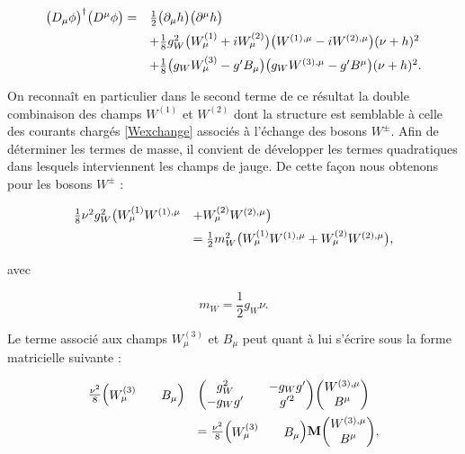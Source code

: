         \begin{equation*}
        \begin{array}{ll}
            \bigl(D_{\mu}\phi\bigr)^{\dag}\bigl(D^{\mu}\phi\bigr) = & \frac{1}{2}\bigl(\partial_{\mu}h\bigr)\bigl(\partial^{\mu}h\bigr) \vspace{5pt} \\
            & +\frac{1}{8}g_W^2\bigl(W^{(1)}_{\mu}+iW^{(2)}_{\mu}\bigr)\bigl(W^{(1),\mu}-iW^{(2),\mu}\bigr)(\nu+h)^2 \vspace{5pt} \\
            & +\frac{1}{8}\bigl(g_WW^{(3)}_{\mu}-g'B_{\mu}\bigr)\bigl(g_WW^{(3),\mu}-g'B^{\mu}\bigr)(\nu+h)^2.
        \end{array}
        \end{equation*}

        On reconnaît en particulier dans le second terme de ce résultat la double combinaison des champs $W^{(1)}$ et $W^{(2)}$ dont la structure est semblable à celle des courants chargés \ref{Wexchange} associés à l'échange des bosons $W^{\pm}$. Afin de déterminer les termes de masse, il convient de développer les termes quadratiques dans lesquels interviennent les champs de jauge. De cette façon nous obtenons pour les bosons $W^{\pm}$ :

        \begin{equation*}
        \begin{array}{ll}
            \frac{1}{8}\nu^2g^2_W\bigl(W^{(1)}_{\mu}W^{(1),\mu}&+W^{(2)}_{\mu}W^{(2),\mu}\bigr) \vspace{5pt}\\
            &=\frac{1}{2}m^2_W\bigl(W^{(1)}_{\mu}W^{(1),\mu}+W^{(2)}_{\mu}W^{(2),\mu}\bigr),
        \end{array}
        \end{equation*}

        avec

        \begin{equation}
            \boxed{
            m_W=\frac{1}{2}g_W\nu.
            }
        \end{equation}

        Le terme associé aux champs $W_{\mu}^{(3)}$ et $B_{\mu}$ peut quant à lui s'écrire sous la forme matricielle suivante :

        \begin{equation*}
        \begin{array}{ll}
            \frac{\nu^2}{8}\mqty(W^{(3)}_{\mu}&&B_{\mu})&\mqty(g^2_W&&-g_Wg'\\-g_Wg'&&g'^2)\mqty(W^{(3),\mu}\\B^{\mu}) \vspace{5pt} \\
            &=\frac{\nu^2}{8}\mqty(W^{(3)}_{\mu}&&B_{\mu})\vb{M}\mqty(W^{(3),\mu}\\B^{\mu}),
        \end{array}
        \end{equation*}

